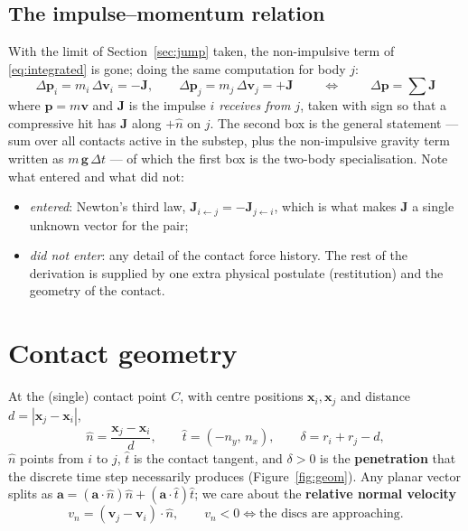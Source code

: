 \documentclass[a4paper,11pt]{article}
\newcommand{\x}{\bm{x}}
\newcommand{\vV}{\bm{v}}
\newcommand{\Jimp}{\bm{J}}
\newcommand{\hh}{\hat{n}}
\newcommand{\ttt}{\hat{t}}
\newcommand{\pp}{\bm{p}}          %
\begin{document}
\subsection{The impulse--momentum relation}
With the limit of Section~\ref{sec:jump} taken, the non-impulsive term of
\eqref{eq:integrated} is gone; doing the same computation for body $j$:
\begin{equation}
  \boxed{\;
  \Delta\pp_i=m_i\,\Delta\vV_i=-\Jimp,\qquad
  \Delta\pp_j=m_j\,\Delta\vV_j=+\Jimp \;}
  \qquad\Longleftrightarrow\qquad
  \boxed{\;\Delta\pp=\textstyle\sum\Jimp\;}
  \label{eq:impulse-momentum}
\end{equation}
where $\pp=m\vV$ and $\Jimp$ is the impulse \emph{$i$ receives from $j$}, taken
with sign so that a compressive hit has $\Jimp$ along $+\hh$ on $j$. The second
box is the general statement --- sum over all contacts active in the substep,
plus the non-impulsive gravity term written as $m\,\bm g\,\Delta t$ --- of which
the first box is the two-body specialisation. Note what entered and what did
not:
\begin{itemize}
\item \emph{entered}: Newton's third law, $\Jimp_{i\leftarrow j}=-\Jimp_{j\leftarrow i}$,
  which is what makes $\Jimp$ a single unknown vector for the pair;
\item \emph{did not enter}: any detail of the contact force history. The rest of
  the derivation is supplied by one extra physical postulate (restitution) and
  the geometry of the contact.
\end{itemize}

\section{Contact geometry}

At the (single) contact point $C$, with centre positions $\x_i,\x_j$ and
distance $d=|\x_j-\x_i|$,
\begin{equation}
  \hh=\frac{\x_j-\x_i}{d},\qquad
  \ttt=(-n_y,\,n_x),\qquad
  \delta=r_i+r_j-d ,
  \label{eq:geometry}
\end{equation}
$\hh$ points from $i$ to $j$, $\ttt$ is the contact tangent, and $\delta>0$ is
the \textbf{penetration} that the discrete time step necessarily produces
(Figure~\ref{fig:geom}). Any planar vector splits as
$\bm a=(\bm a\cdot\hh)\hh+(\bm a\cdot\ttt)\ttt$; we care about the
\textbf{relative normal velocity}
\begin{equation}
  v_n=(\vV_j-\vV_i)\cdot\hh ,
  \qquad
  v_n<0 \Longleftrightarrow \text{the discs are approaching}.
  \label{eq:vn}
\end{equation}
\end{document}
